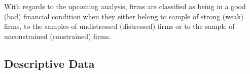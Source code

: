 \documentclass[12pt]{article}
\begin{document}

With regards to the upcoming analysis, firms are classified as being in a good (bad) financial condition when they either belong to sample of strong (weak) firms, to the samples of undistressed (distressed) firms or to the sample of unconstrained (constrained) firms.


\subsection{Descriptive Data}
\end{document}
